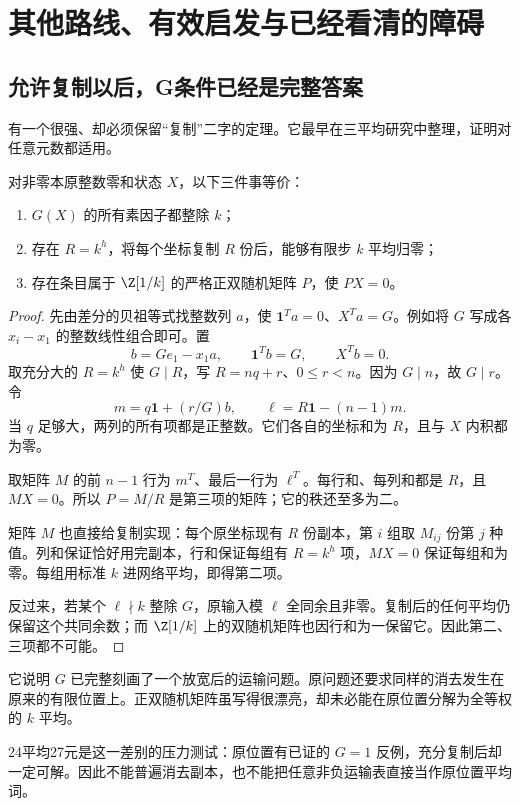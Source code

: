\chapter{其他路线、有效启发与已经看清的障碍}\label{ch:obstacles}
\section{允许复制以后，G条件已经是完整答案}
有一个很强、却必须保留“复制”二字的定理。它最早在三平均研究中整理，证明对任意元数都适用。

\begin{theorem}[复制稳定化]
对非零本原整数零和状态 $X$，以下三件事等价：
\begin{enumerate}
\item $G(X)$ 的所有素因子都整除 $k$；
\item 存在 $R=k^h$，将每个坐标复制 $R$ 份后，能够有限步 $k$ 平均归零；
\item 存在条目属于 $\Z[1/k]$ 的严格正双随机矩阵 $P$，使 $PX=0$。
\end{enumerate}
\end{theorem}
\begin{proof}
先由差分的贝祖等式找整数列 $a$，使 $\mathbf1^Ta=0$、$X^Ta=G$。例如将 $G$ 写成各 $x_i-x_1$ 的整数线性组合即可。置
\[b=Ge_1-x_1a,
\qquad\mathbf1^Tb=G,\qquad X^Tb=0.
\]
取充分大的 $R=k^h$ 使 $G\mid R$，写 $R=nq+r$、$0\le r<n$。因为 $G\mid n$，故 $G\mid r$。令
\[m=q\mathbf1+(r/G)b,\qquad
\ell=R\mathbf1-(n-1)m.
\]
当 $q$ 足够大，两列的所有项都是正整数。它们各自的坐标和为 $R$，且与 $X$ 内积都为零。

取矩阵 $M$ 的前 $n-1$ 行为 $m^T$、最后一行为 $\ell^T$。每行和、每列和都是 $R$，且 $MX=0$。所以 $P=M/R$ 是第三项的矩阵；它的秩还至多为二。

矩阵 $M$ 也直接给复制实现：每个原坐标现有 $R$ 份副本，第 $i$ 组取 $M_{ij}$ 份第 $j$ 种值。列和保证恰好用完副本，行和保证每组有 $R=k^h$ 项，$MX=0$ 保证每组和为零。每组用标准 $k$ 进网络平均，即得第二项。

反过来，若某个 $\ell\nmid k$ 整除 $G$，原输入模 $\ell$ 全同余且非零。复制后的任何平均仍保留这个共同余数；而 $\Z[1/k]$ 上的双随机矩阵也因行和为一保留它。因此第二、三项都不可能。
\end{proof}

它说明 $G$ 已完整刻画了一个放宽后的运输问题。原问题还要求同样的消去发生在原来的有限位置上。正双随机矩阵虽写得很漂亮，却未必能在原位置分解为全等权的 $k$ 平均。

24平均27元是这一差别的压力测试：原位置有已证的 $G=1$ 反例，充分复制后却一定可解。因此不能普遍消去副本，也不能把任意非负运输表直接当作原位置平均词。


